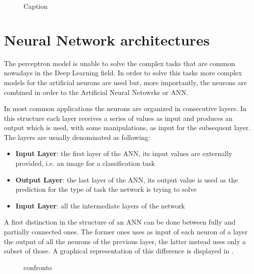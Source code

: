 \begin{figure}[h]
    \centering

\caption{Caption}
    \label{fig:perceptron}
\end{figure}

\section{Neural Network architectures}

The perceptron model is unable to solve the complex tasks that are common nowadays in the Deep Learning field. In order to solve this tasks more complex models for the artificial neurons are used but, more importantly, the neurons are combined in order to the Artificial Neural Netowrks or ANN.

In most common applications the neurons are organized in consecutive layers.
In this structure each layer receives a series of values as input and produces an output which is used, with some manipulations, as input for the subsequent layer. The layers are usually denominated as following:
\begin{itemize}
    \item \textbf{Input Layer}: the first layer of the ANN, its input values are externally provided, i.e. an image for a classification task
    \item \textbf{Output Layer}: the last layer of the ANN, its output value is used as the prediction for the type of task the network is trying to solve
    \item \textbf{Input Layer}: all the intermediate layers of the network  
\end{itemize}

A first distinction in the structure of an ANN can be done between fully and partially connected ones. The former ones uses as input of each neuron of a layer the output of all the neurons of the previous layer, the latter instead uses only a subset of those. A graphical representation of this difference is displayed in .

\begin{figure}[h]
    \centering
    \begin{minipage}[c]{0.49\linewidth}
        \vspace{0pt}
        \centering
    \end{minipage}%
    \hfill%
    \begin{minipage}[c]{0.49\linewidth}
        \vspace{0pt}
        \centering
    \end{minipage}%
    \caption{confronto}
    \label{fig:full_part_ANN}
\end{figure}

